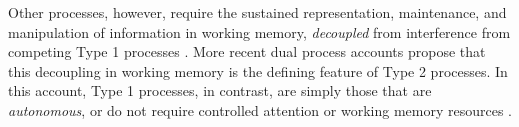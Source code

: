 




Other processes, however,
require the sustained representation,
maintenance, and manipulation of information in working memory,
\emph{decoupled} from interference from
competing Type 1 processes \citep{Stanovich2008,Evans2013a,Gilbert1991}.
More recent dual process accounts
\citep[see][]{Evans2013a,Stanovich2012,Evans2004}
propose that this decoupling in working memory
is the defining feature of Type 2 processes.
In this account, Type 1 processes, in contrast,
are simply those that are \emph{autonomous},
or do not require controlled attention or working memory resources
\citep[p. 236]{Evans2013a}.

